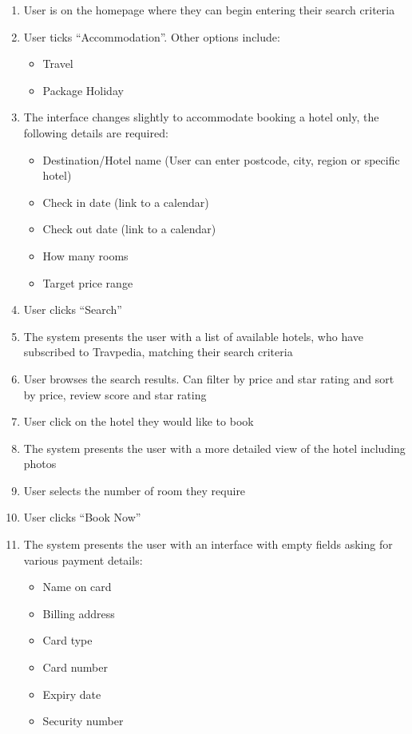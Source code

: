 \begin{enumerate}
	\item User is on the homepage where they can begin entering their
		search criteria
	\item User ticks ``Accommodation''. Other options include:
		\begin{itemize}
			\item Travel
			\item Package Holiday
		\end{itemize}
	\item The interface changes slightly to accommodate booking a hotel
		only, the following details are required:
		\begin{itemize}
			\item Destination/Hotel name (User can enter postcode, city,
				region or specific hotel)
			\item Check in date (link to a calendar)
			\item Check out date (link to a calendar)
			\item How many rooms
			\item Target price range
		\end{itemize}
	\item User clicks ``Search''
	\item The system presents the user with a list of available hotels, who
		have subscribed to Travpedia, matching their search criteria
	\item User browses the search results. Can filter by price and star
		rating and sort by price, review score and star rating
	\item User click on the hotel they would like to book
	\item The system presents the user with a more detailed view of the
		hotel including photos
	\item User selects the number of room they require
	\item User clicks ``Book Now''
	\item The system presents the user with an interface with empty fields
		asking for various payment details:
		\begin{itemize}
			\item Name on card
			\item Billing address
			\item Card type
			\item Card number
			\item Expiry date
			\item Security number

\end{itemize}
\end{enumerate}
